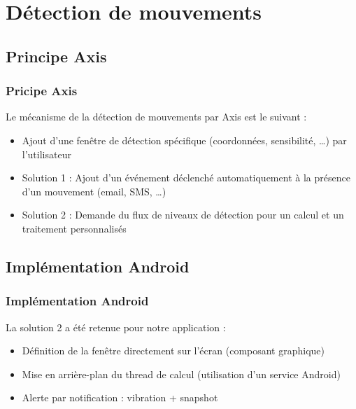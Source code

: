 \documentclass{beamer}
\begin{document}
\section{Détection de mouvements}
\subsection{Principe Axis}
 \begin{frame}
   \frametitle{Pricipe Axis}
    Le mécanisme de la détection de mouvements par Axis est le suivant :
   \begin{itemize}
    \item Ajout d'une fenêtre de détection spécifique (coordonnées,
    sensibilité, \ldots) par l'utilisateur
    \item Solution 1 : Ajout d'un événement déclenché automatiquement à la
    présence d'un mouvement (email, SMS, \ldots)
    \item Solution 2 : Demande du flux de niveaux de détection pour un
    calcul et un traitement personnalisés
   \end{itemize}
\end{frame}

\subsection{Implémentation Android}
 \begin{frame}
   \frametitle{Implémentation Android}
    La solution 2 a été retenue pour notre application :
    \begin{itemize}
    \item Définition de la fenêtre directement sur l'écran (composant
    graphique)
    \item Mise en arrière-plan du thread de calcul (utilisation d'un service
    Android)
    \item Alerte par notification : vibration + snapshot
   \end{itemize}
\end{frame}












\end{document}

